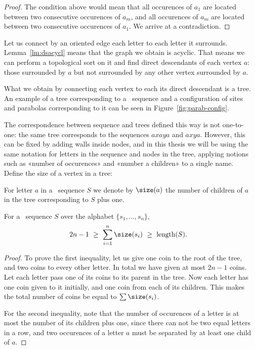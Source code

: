 \begin{proof}The condition above would mean that all occurences of $a_1$ are located between two consecutive occurences of $a_m$, and all occurences of $a_m$ are located between two consecutive occurences of $a_1$. We arrive at a contradiction.\end{proof}

Let us connect by an oriented edge each letter to each letter it surrounds. Lemma~\ref{lm:dsacycl} means that the graph we obtain is acyclic. That means we can perform a topological sort on it and find direct descendants of each vertex $a$: those surrounded by $a$ but not surrounded by any other vertex surrounded by $a$.



What we obtain by connecting each vertex to each its direct descendant is a tree. An example of a tree corresponding to a \Ds~sequence and a configuration of sites and parabolas corresponding to it can be seen in Figure~\ref{fig:parab-config}.

The correspondence between \Ds sequence and trees defined this way is not one-to-one: the same tree corresponds to the sequences $axaya$ and $axya$. However, this can be fixed by adding walls inside nodes, and in this thesis we will be using the same notation for letters in the sequence and nodes in the tree, applying notions such as «number of occurences» and «number a children» to a single name. Define the size of a vertex in a tree:

\begin{definition} \label{def:dssize}
	For letter $a$ in a \Ds~sequence $S$ we denote by $\size(a)$ the number of children of $a$ in the tree corresponding to $S$ plus one.
\end{definition}

\begin{lemma} \label{lm:sumsizes}
	For a \Ds~sequence $S$ over the alphabet $\{ s_1, \ldots, s_n \}$,
	\[ 2n-1\ \ge\ \sum\limits_{i=1}^{n} \size(s_i)\ \ge\ \text{\rm length} (S). \]
\end{lemma}

\begin{proof} To prove the first inequality, let us give one coin to the root of the tree, and two coins to every other letter. In total we have given at most $2n-1$ coins. Let each letter pass one of its coins to its parent in the tree. Now each letter has one coin given to it initially, and one coin from each of its children. This makes the total number of coins be equal to $\sum \size(s_i)$.

For the second inequality, note that the number of occurences of a letter is at most the number of its children plus one, since there can not be two equal letters in a row, and two occurences of a letter $a$ must be separated by at least one child of $a$.
\end{proof}


